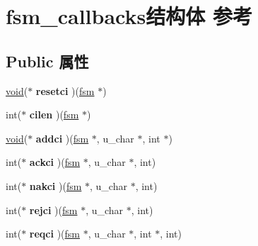 \hypertarget{structfsm__callbacks}{}\section{fsm\+\_\+callbacks结构体 参考}
\label{structfsm__callbacks}
\subsection*{Public 属性}
\begin{DoxyCompactItemize}
\item 
\mbox{\label{structfsm__callbacks_aeaca3e95343b26de53b2674165c7b2a9}} 
\hyperlink{interfacevoid}{void}($\ast$ {\bfseries resetci} )(\hyperlink{structfsm}{fsm} $\ast$)
\item 
\mbox{\label{structfsm__callbacks_a87fae579498db14cee42a58475619f33}} 
int($\ast$ {\bfseries cilen} )(\hyperlink{structfsm}{fsm} $\ast$)
\item 
\mbox{\label{structfsm__callbacks_ad223b8ac94f31e9b1dc9fc17a684d3ca}} 
\hyperlink{interfacevoid}{void}($\ast$ {\bfseries addci} )(\hyperlink{structfsm}{fsm} $\ast$, u\+\_\+char $\ast$, int $\ast$)
\item 
\mbox{\label{structfsm__callbacks_a99d01c02c1cbd3e530d206f804096707}} 
int($\ast$ {\bfseries ackci} )(\hyperlink{structfsm}{fsm} $\ast$, u\+\_\+char $\ast$, int)
\item 
\mbox{\label{structfsm__callbacks_a00b94d2deb18b12f2f5742b84ec1fba4}} 
int($\ast$ {\bfseries nakci} )(\hyperlink{structfsm}{fsm} $\ast$, u\+\_\+char $\ast$, int)
\item 
\mbox{\label{structfsm__callbacks_a9e337f3227581976e0e26afd8dd8cfd2}} 
int($\ast$ {\bfseries rejci} )(\hyperlink{structfsm}{fsm} $\ast$, u\+\_\+char $\ast$, int)
\item 
\mbox{\label{structfsm__callbacks_a0855dd3edbbdb0fafdd1341857dafe54}} 
int($\ast$ {\bfseries reqci} )(\hyperlink{structfsm}{fsm} $\ast$, u\+\_\+char $\ast$, int $\ast$, int)
\item 
\mbox{\label{structfsm__callbacks_a661999ab9537785ada27d35025b02d67}} 

\end{DoxyCompactItemize}
